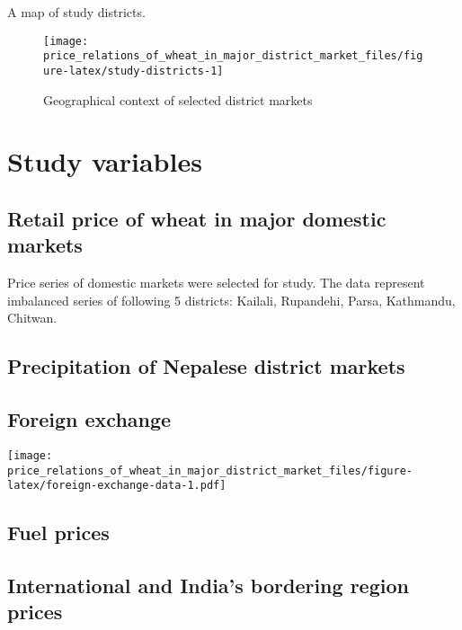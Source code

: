 \documentclass[
  12pt,
]{article}
\begin{document}
A map of study districts.

\begin{figure}
\texttt{[image: price\_relations\_of\_wheat\_in\_major\_district\_market\_files/figure-latex/study-districts-1]} \caption{Geographical context of selected district markets}\label{fig:study-districts}
\end{figure}

\hypertarget{study-variables}{%
\section{Study variables}\label{study-variables}}

\hypertarget{retail-price-of-wheat-in-major-domestic-markets}{%
\subsection{Retail price of wheat in major domestic markets}\label{retail-price-of-wheat-in-major-domestic-markets}}

Price series of domestic markets were selected for study. The data represent imbalanced series of following 5 districts: Kailali, Rupandehi, Parsa, Kathmandu, Chitwan.

\hypertarget{precipitation-of-nepalese-district-markets}{%
\subsection{Precipitation of Nepalese district markets}\label{precipitation-of-nepalese-district-markets}}

\hypertarget{foreign-exchange}{%
\subsection{Foreign exchange}\label{foreign-exchange}}

\texttt{[image: price\_relations\_of\_wheat\_in\_major\_district\_market\_files/figure-latex/foreign-exchange-data-1.pdf]}

\hypertarget{fuel-prices}{%
\subsection{Fuel prices}\label{fuel-prices}}

\hypertarget{international-and-indias-bordering-region-prices}{%
\subsection{International and India's bordering region prices}\label{international-and-indias-bordering-region-prices}}
\end{document}
